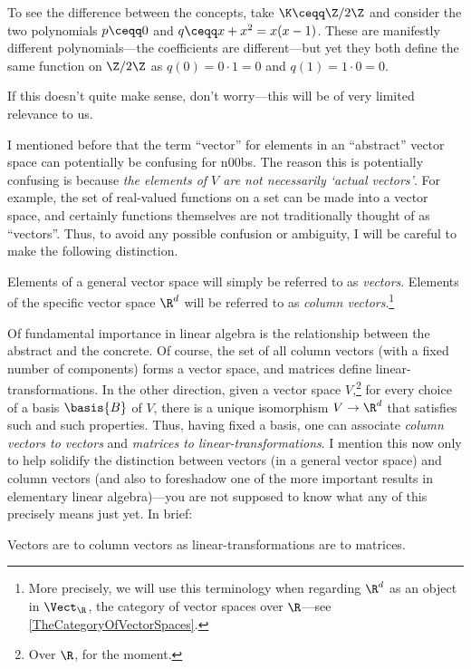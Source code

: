 To see the difference between the concepts, take $\K \ceqq \Z /2\Z$ and consider the two polynomials $p\ceqq 0$ and $q\ceqq x+x^2=x(x-1)$.  These are manifestly different polynomials---the coefficients are different---but yet they both define the same function on $\Z /2\Z$ as $q(0)=0\cdot 1=0$ and $q(1)=1\cdot 0=0$.

If this doesn't quite make sense, don't worry---this will be of very limited relevance to us.

\horizontalrule

I mentioned before that the term ``vector'' for elements in an ``abstract'' vector space can potentially be confusing for n00bs.  The reason this is potentially confusing is because \emph{the elements of $V$ are not necessarily `actual vectors'}.  For example, the set of real-valued functions on a set can be made into a vector space, and certainly functions themselves are not traditionally thought of as ``vectors''.  Thus, to avoid any possible confusion or ambiguity, I will be careful to make the following distinction.
\begin{displayquote}
	Elements of a general vector space will simply be referred to as \emph{vectors}.  Elements of the specific vector space $\R ^d$ will be referred to as \emph{column vectors}.\footnote{More precisely, we will use this terminology when regarding $\R ^d$ as an object in $\Vect _{\R}$, the category of vector spaces over $\R$---see \cref{TheCategoryOfVectorSpaces}.}
\end{displayquote}

Of fundamental importance in linear algebra is the relationship between the abstract and the concrete.  Of course, the set of all column vectors (with a fixed number of components) forms a vector space, and matrices define linear-transformations.  In the other direction, given a vector space $V$,\footnote{Over $\R$, for the moment.} for every choice of a basis $\basis{B}$ of $V$, there is a unique isomorphism $V\rightarrow \R ^d$ that satisfies such and such properties.  Thus, having fixed a basis, one can associate \emph{column vectors to vectors} and \emph{matrices to linear-transformations}.  I mention this now only to help solidify the distinction between vectors (in a general vector space) and column vectors (and also to foreshadow one of the more important results in elementary linear algebra)---you are not supposed to know what any of this precisely means just yet.  In brief:
\begin{displayquote}
	Vectors are to column vectors as linear-transformations are to matrices.
\end{displayquote}

